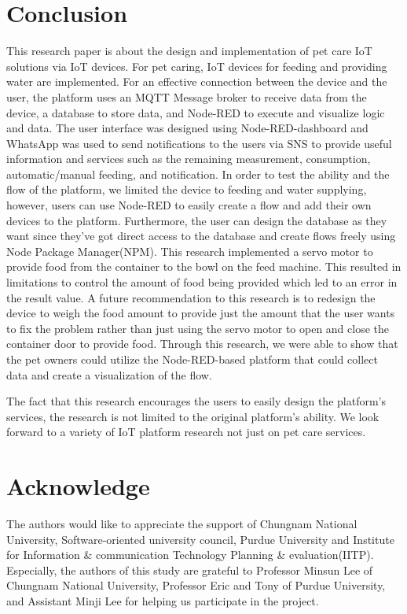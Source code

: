 \documentclass[conference]{IEEEtran}
\begin{document}
\section{Conclusion}
This research paper is about the design and implementation of pet care IoT solutions via IoT
devices. For pet caring, IoT devices for feeding and providing water are implemented. For an
effective connection between the device and the user, the platform uses an MQTT Message
broker to receive data from the device, a database to store data, and Node-RED to execute and
visualize logic and data. The user interface was designed using Node-RED-dashboard and
WhatsApp was used to send notifications to the users via SNS to provide useful information and
services such as the remaining measurement, consumption, automatic/manual feeding, and
notification. In order to test the ability and the flow of the platform, we limited the device to feeding and water
supplying, however, users can use Node-RED to easily create a flow and add their own devices
to the platform. Furthermore, the user can design the database as they want since they’ve got
direct access to the database and create flows freely using Node Package Manager(NPM).
This research implemented a servo motor to provide food from the container to the bowl on the
feed machine. This resulted in limitations to control the amount of food being provided which led
to an error in the result value. A future recommendation to this research is to redesign the
device to weigh the food amount to provide just the amount that the user wants to fix the
problem rather than just using the servo motor to open and close the container door to provide
food. Through this research, we were able to show that the pet owners could utilize the
Node-RED-based platform that could collect data and create a visualization of the flow. 

The fact that this research encourages the users to easily design the platform’s services, the research is
not limited to the original platform’s ability. We look forward to a variety of IoT platform research
not just on pet care services.


\section{Acknowledge}
The authors would like to appreciate the support of Chungnam National University, Software-oriented university council, Purdue University and Institute for Information \& communication Technology Planning \& evaluation(IITP). Especially, the authors of this study are grateful to Professor Minsun Lee of Chungnam National University, Professor Eric and Tony of Purdue University, and Assistant Minji Lee for helping us participate in the project.
\end{document}
